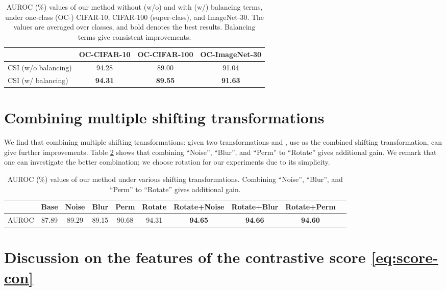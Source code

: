 \documentclass{article}
\begin{document}
\begin{table}[h]
\centering\small
\caption{
AUROC (\%) values of our method without (w/o) and with (w/) balancing terms, under one-class (OC-) CIFAR-10, CIFAR-100 (super-class), and ImageNet-30. The values are averaged over classes, and bold denotes the best results. Balancing terms give consistent improvements.
}\label{tab:balance}
\begin{tabular}{lccc}
\toprule
& OC-CIFAR-10 & OC-CIFAR-100 & OC-ImageNet-30 \\
\midrule
CSI (w/o balancing) & 94.28 & 89.00 & 91.04 \\
CSI (w/ balancing) & \textbf{94.31} & \textbf{89.55} & \textbf{91.63} \\
\bottomrule
\end{tabular}
\end{table}



  \section{Combining multiple shifting transformations}
\label{appx:comb_trans}

We find that combining multiple shifting transformations: given two transformations  and , use  as the combined shifting transformation, can give further improvements. Table \ref{tab:comb_trans} shows that combining ``Noise'', ``Blur'', and ``Perm'' to ``Rotate'' gives additional gain. We remark that one can investigate the better combination; we choose rotation for our experiments due to its simplicity.


\begin{table}[h]
\centering\small
\caption{
AUROC (\%) values of our method under various shifting transformations. Combining ``Noise'', ``Blur'', and ``Perm'' to ``Rotate'' gives additional gain.
}\label{tab:comb_trans}
\begin{tabular}{rc|cccccccc}
\toprule
& Base & Noise & Blur & Perm & Rotate & Rotate+Noise & Rotate+Blur & Rotate+Perm  \\
\midrule
AUROC & 87.89 & 89.29 & 89.15 & 90.68 & 94.31 & \textbf{94.65} & \textbf{94.66} & \textbf{94.60} \\
\bottomrule
\end{tabular}
\end{table}
 
 
\clearpage
\section{Discussion on the features of the contrastive score \eqref{eq:score-con}}
\label{appx:norm}
\end{document}
